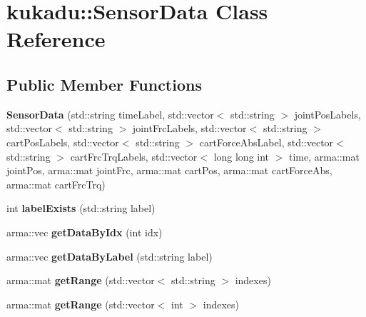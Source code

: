 \hypertarget{classkukadu_1_1SensorData}{}\section{kukadu\+:\+:Sensor\+Data Class Reference}
\label{classkukadu_1_1SensorData}
\subsection*{Public Member Functions}
\begin{DoxyCompactItemize}
\item 
{\bfseries Sensor\+Data} (std\+::string time\+Label, std\+::vector$<$ std\+::string $>$ joint\+Pos\+Labels, std\+::vector$<$ std\+::string $>$ joint\+Frc\+Labels, std\+::vector$<$ std\+::string $>$ cart\+Pos\+Labels, std\+::vector$<$ std\+::string $>$ cart\+Force\+Abs\+Label, std\+::vector$<$ std\+::string $>$ cart\+Frc\+Trq\+Labels, std\+::vector$<$ long long int $>$ time, arma\+::mat joint\+Pos, arma\+::mat joint\+Frc, arma\+::mat cart\+Pos, arma\+::mat cart\+Force\+Abs, arma\+::mat cart\+Frc\+Trq)\hypertarget{classkukadu_1_1SensorData_a5f344e167f219c3ffb8d44b1b8ad2fe8}{}\label{classkukadu_1_1SensorData_a5f344e167f219c3ffb8d44b1b8ad2fe8}

\item 
int {\bfseries label\+Exists} (std\+::string label)\hypertarget{classkukadu_1_1SensorData_ae4659342261e7cf3df9d2e76b784dbcf}{}\label{classkukadu_1_1SensorData_ae4659342261e7cf3df9d2e76b784dbcf}

\item 
arma\+::vec {\bfseries get\+Data\+By\+Idx} (int idx)\hypertarget{classkukadu_1_1SensorData_a9fc8b3e8a18362bfeed829c75372487f}{}\label{classkukadu_1_1SensorData_a9fc8b3e8a18362bfeed829c75372487f}

\item 
arma\+::vec {\bfseries get\+Data\+By\+Label} (std\+::string label)\hypertarget{classkukadu_1_1SensorData_ade9735bb77f4ddeb3f251d9503afac8d}{}\label{classkukadu_1_1SensorData_ade9735bb77f4ddeb3f251d9503afac8d}

\item 
arma\+::mat {\bfseries get\+Range} (std\+::vector$<$ std\+::string $>$ indexes)\hypertarget{classkukadu_1_1SensorData_abcd21262bfc8dc0de0abd48184b0467f}{}\label{classkukadu_1_1SensorData_abcd21262bfc8dc0de0abd48184b0467f}

\item 
arma\+::mat {\bfseries get\+Range} (std\+::vector$<$ int $>$ indexes)\hypertarget{classkukadu_1_1SensorData_a4bce25340f80cb54c38b15590143602d}{}\label{classkukadu_1_1SensorData_a4bce25340f80cb54c38b15590143602d}


\end{DoxyCompactItemize}
